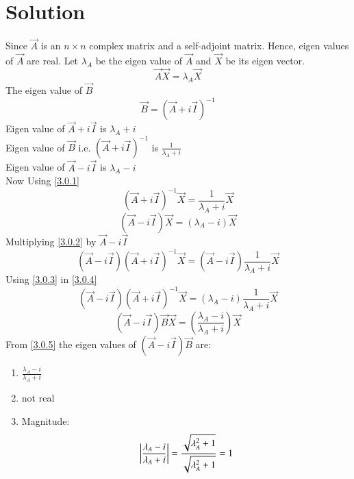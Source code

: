 \documentclass[journal,12pt,twocolumn]{IEEEtran}
\begin{document}
\section{Solution}
Since $\vec{A}$ is an $n \times n$ complex matrix and a self-adjoint matrix. Hence, eigen values of $\vec{A}$ are real.
Let $\lambda_A$ be the eigen value of $\vec{A}$ and $\vec{X}$ be its eigen vector.
\begin{equation}\label{3.0.1}
\vec{A}\vec{X} = \lambda_A \vec{X} 
\end{equation}
The eigen value of $\vec{B}$
\begin{equation*}
\vec{B} = (\vec{A}+i\vec{I})^{-1}
\end{equation*}
 Eigen value of $\vec{A}+i\vec{I}$ is $\lambda_A+i$\\
 Eigen value of $\vec{B}$ i.e. $(\vec{A}+i\vec{I})^{-1}$ is $\frac{1}{\lambda_A+i}$\\
 Eigen value of $\vec{A}-i\vec{I}$ is $\lambda_A-i$\\
 Now Using \eqref{3.0.1}
 \begin{equation}\label{3.0.2}
 (\vec{A}+i\vec{I})^{-1} \vec{X} = \frac{1}{\lambda_A+i} \vec{X}
 \end{equation}
 \begin{equation}\label{3.0.3}
 (\vec{A}-i\vec{I}) \vec{X} = (\lambda_A-i) \vec{X}
 \end{equation}
 Multiplying \eqref{3.0.2} by $\vec{A}-i\vec{I}$
 \begin{equation}\label{3.0.4}
 (\vec{A}-i\vec{I})(\vec{A}+i\vec{I})^{-1} \vec{X} = (\vec{A}-i\vec{I})  \frac{1}{\lambda_A+i} \vec{X}
 \end{equation}
 Using \eqref{3.0.3} in \eqref{3.0.4}
 \begin{equation*}
 (\vec{A}-i\vec{I})(\vec{A}+i\vec{I})^{-1} \vec{X} = (\lambda_A-i) \frac{1}{\lambda_A+i} \vec{X}
 \end{equation*}
 \begin{equation} \label{3.0.5}
 (\vec{A}-i\vec{I})\vec{B} \vec{X} = \left(\frac{\lambda_A-i}{\lambda_A+i}\right) \vec{X}
 \end{equation}
 From \eqref{3.0.5} the eigen values of $(\vec{A}-i\vec{I})\vec{B}$ are:
 \begin{enumerate}
 \item $\frac{\lambda_A-i}{\lambda_A+i}$
 \item not real 
 \item Magnitude:
 \begin{equation}
 \left| \frac{\lambda_A-i}{\lambda_A+i} \right| = \frac{\sqrt{\lambda_A^2+1}}{\sqrt{\lambda_A^2+1}}\\ = 1
 \end{equation}
 \end{enumerate}
\end{document}
